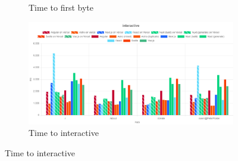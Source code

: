 \documentclass[a4paper, 10pt]{article}
\begin{document}
\begin{figure}[ht!]
\begin{subfigure}{0.95\linewidth}
\begin{center}
    \end{center}
    \caption{Time to first byte}\label{subfig:LH:timeToFirstByte}
  \end{subfigure}
  \begin{subfigure}{0.95\linewidth}
    \begin{center}
      \includegraphics[width=\linewidth, keepaspectratio]{img/lighthouse-results/TTI.png}
    \end{center}
    \caption{Time to interactive}\label{subfig:LH:interactive}
  \end{subfigure}
\end{figure}
\end{document}
